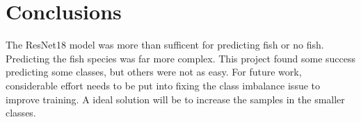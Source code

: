 \section{Conclusions}
The ResNet18 model was more than sufficent for predicting fish or no fish. Predicting the fish species was far more complex.
This project found some success predicting some classes, but others were not as easy.
For future work, considerable effort needs to be put into fixing the class imbalance issue to improve training.
A ideal solution will be to increase the samples in the smaller classes.
